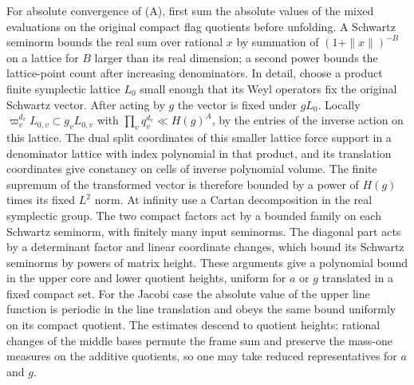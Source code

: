 For absolute convergence of (A), first sum the absolute values
of the mixed evaluations on the original compact flag quotients
before unfolding. A Schwartz seminorm bounds the real sum over
rational \(x\) by summation of
\((1+\|x\|)^{-B}\) on a lattice for \(B\) larger than
its real dimension; a second power bounds the lattice-point
count after increasing denominators. In detail, choose a product
finite symplectic lattice \(L_0\) small enough that its Weyl
operators fix the original Schwartz vector. After acting by
\(g\) the vector is fixed under \(gL_0\). Locally
\(\varpi_v^{d_v}L_{0,v}\subset g_v L_{0,v}\) with
\(\prod_v q_v^{d_v}\ll H(g)^A\), by the entries of the
inverse action on this lattice. The dual split coordinates of
this smaller lattice force support in a denominator lattice
with index polynomial in that product, and its translation
coordinates give constancy on cells of inverse polynomial
volume. The finite supremum of the transformed vector is
therefore bounded by a power of \(H(g)\) times its fixed
\(L^2\) norm. At infinity use a Cartan decomposition in the
real symplectic group. The two compact factors act by a
bounded family on each Schwartz seminorm, with finitely many
input seminorms. The diagonal part acts by a determinant
factor and linear coordinate changes, which bound its
Schwartz seminorms by powers of matrix height. These arguments
give a polynomial bound in the upper
core and lower quotient heights, uniform for \(a\) or \(g\)
translated in a fixed compact set. For the Jacobi case the
absolute value of the upper line function is periodic in the
line translation and obeys the same bound uniformly on its
compact quotient. The estimates descend to quotient heights:
rational changes of the middle bases permute the frame sum
and preserve the mass-one measures on the additive quotients,
so one may take reduced representatives for \(a\) and \(g\).

